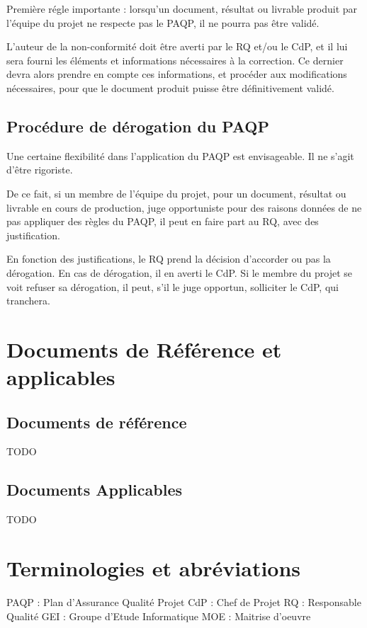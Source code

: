 Première régle importante : lorsqu'un document, résultat ou livrable produit par l'équipe du projet ne respecte pas le PAQP, il ne pourra pas être validé.

L'auteur de la non-conformité doit être averti par le RQ et/ou le CdP, et il lui sera fourni les éléments et informations nécessaires à la correction. Ce dernier devra alors prendre en compte ces informations, et procéder aux modifications nécessaires, pour que le document produit puisse être définitivement validé.

\subsection{Procédure de dérogation du PAQP}
Une certaine flexibilité dans l'application du PAQP est envisageable. Il ne s'agit d'être rigoriste.

De ce fait, si un membre de l'équipe du projet, pour un document, résultat ou livrable en cours de production, juge opportuniste pour des raisons données de ne pas appliquer des règles du PAQP, il peut en faire part au RQ, avec des justification.

En fonction des justifications, le RQ prend la décision d'accorder ou pas la dérogation. En cas de dérogation, il en averti le CdP. Si le membre du projet se voit refuser sa dérogation, il peut, s'il le juge opportun, solliciter le CdP, qui tranchera.
\section{Documents de Référence et applicables}
\subsection{Documents de référence}
\begin{center} \begin{Large}
TODO
\end{Large}  \end{center}
\subsection{Documents Applicables}
TODO
\section{Terminologies et abréviations}

PAQP : Plan d’Assurance Qualité Projet
CdP : Chef de Projet       
RQ : Responsable Qualité       
GEI : Groupe d'Etude Informatique       
MOE : Maitrise d'oeuvre
         
